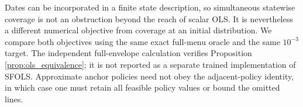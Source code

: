 Dates can be incorporated in a finite state description, so simultaneous statewise coverage is not an obstruction beyond the reach of scalar OLS. It is nevertheless a different numerical objective from coverage at an initial distribution. We compare both objectives using the same exact full-menu oracle and the same $10^{-3}$ target. The independent full-envelope calculation verifies Proposition \ref{prop:ols_equivalence}; it is not reported as a separate trained implementation of SFOLS. Approximate anchor policies need not obey the adjacent-policy identity, in which case one must retain all feasible policy values or bound the omitted lines.

